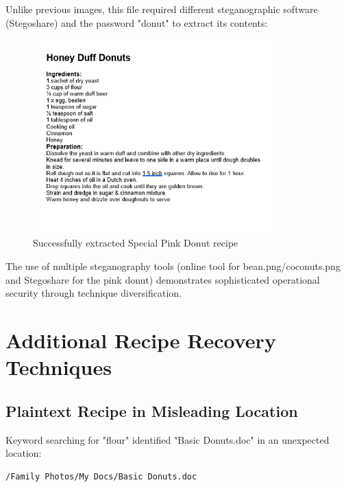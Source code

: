 Unlike previous images, this file required different steganographic software (Stegoshare) and the password "donut" to extract its contents:

\begin{figure}[htbp]
    \centering
    \includegraphics[width=0.85\textwidth]{images/Artifact and Evidence Recovery/SpecialPinkDonut_extract.png}
    \caption{Successfully extracted Special Pink Donut recipe}
    \label{fig:pink_donut_extract}
\end{figure}

The use of multiple steganography tools (online tool for bean.png/coconuts.png and Stegoshare for the pink donut) demonstrates sophisticated operational security through technique diversification.

\section{Additional Recipe Recovery Techniques}

\subsection{Plaintext Recipe in Misleading Location}
Keyword searching for "flour" identified "Basic Donuts.doc" in an unexpected location:
\begin{verbatim}
/Family Photos/My Docs/Basic Donuts.doc
\end{verbatim}

